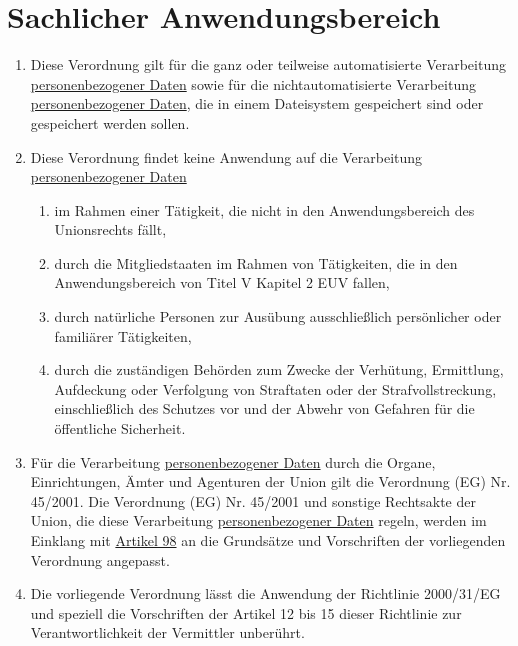 \chapter{Sachlicher Anwendungsbereich}
\label{ch:2}


\begin{enumerate}

  \item Diese Verordnung gilt für die ganz oder teilweise automatisierte Verarbeitung \hyperref[itm:04-1]
   {personenbezogener Daten} sowie für die nichtautomatisierte Verarbeitung \hyperref[itm:04-1]
   {personenbezogener Daten}, die in einem Dateisystem gespeichert sind oder gespeichert werden sollen.
  \label{itm:02-1}

  \item Diese Verordnung findet keine Anwendung auf die Verarbeitung \hyperref[itm:04-1]{personenbezogener Daten}
  \label{itm:02-2}

  \begin{enumerate}
  
    \item im Rahmen einer Tätigkeit, die nicht in den Anwendungsbereich des Unionsrechts fällt,
    \label{itm:02-2a}

    \item durch die Mitgliedstaaten im Rahmen von Tätigkeiten, die in den Anwendungsbereich von Titel V Kapitel 2
     EUV fallen,
    \label{itm:02-2b}

    \item durch natürliche Personen zur Ausübung ausschließlich persönlicher oder familiärer Tätigkeiten,
    \label{itm:02-2c}

    \item durch die zuständigen Behörden zum Zwecke der Verhütung, Ermittlung, Aufdeckung oder Verfolgung von Straftaten
     oder der Strafvollstreckung, einschließlich des Schutzes vor und der Abwehr von Gefahren für die öffentliche
     Sicherheit.
    \label{itm:02-2d}

  \end{enumerate}

  \item Für die Verarbeitung \hyperref[itm:04-1]{personenbezogener Daten} durch die Organe, Einrichtungen, Ämter und
   Agenturen der Union gilt die Verordnung (EG) Nr. 45/2001. Die Verordnung (EG) Nr. 45/2001 und sonstige Rechtsakte
   der Union, die diese Verarbeitung \hyperref[itm:04-1]{personenbezogener Daten} regeln, werden im Einklang
   mit \hyperref[ch:98]{Artikel 98} an die Grundsätze und Vorschriften der vorliegenden Verordnung angepasst.
  \label{itm:02-3}

  \item Die vorliegende Verordnung lässt die Anwendung der Richtlinie 2000/31/EG und speziell die Vorschriften der
   Artikel 12 bis 15 dieser Richtlinie zur Verantwortlichkeit der Vermittler unberührt.
  \label{itm:02-4}

\end{enumerate}


